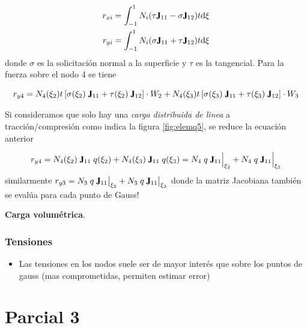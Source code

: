 \documentclass[11pt, a4paper,titlepage]{article}
\newcommand{\rmfontbf}[1]{{\fontfamily{ptm}\selectfont%
\textbf{#1}}}
\newcommand{\di}{\textrm{d}}
\newcommand{\jac}{\rmfontbf{J}}
\newcommand{\feaSP}{null.tex}
\begin{document}
\begin{align}
    r_{xi}&=\int^1_{-1}N_i (\tau \jac_{11}- \sigma \jac_{12})t\di \xi \\
    r_{yi}&=\int^1_{-1}N_i (\sigma \jac_{11}+\tau \jac_{12})t \di \xi 
\end{align}
    donde $\sigma$ es la solicitación normal a la superficie y $\tau$ es la tangencial. Para la fuerza sobre el nodo 4 se tiene
    
    $$r_{y4}= N_4(\xi_2)t\left[\sigma(\xi_2)\; \jac_{11}+\tau(\xi_2)\; \jac_{12}\right] \cdot W_2 + N_4(\xi_3)t\left[\sigma(\xi_3)\; \jac_{11}+\tau(\xi_3)\; \jac_{12}\right]\cdot W_3 $$

    Si consideramos que solo hay una \emph{carga distribuida de linea} a tracción/compresión como indica la figura \ref{fig:elemq5}, se reduce la ecuación anterior
    
    $$ r_{y4} = N_4(\xi_2)\;\jac_{11}\;q(\xi_2) + N_4(\xi_3)\;\jac_{11}\;q(\xi_3) =N_4\;q \;\jac_{11}\Big|_{\xi_2} + N_4\;q\; \jac_{11}\Big|_{\xi_3} $$
    similarmente $r_{y3} = N_3\;q \;\jac_{11}\big|_{\xi_2} + N_3\;q\; \jac_{11}\big|_{\xi_3} $ donde la matriz Jacobiana también se evalúa para cada punto de Gauss!
    
    \textbf{Carga volumétrica}. 
\subsubsection*{Tensiones}
    \begin{itemize}
        \item Las tensiones en los nodos suele ser de mayor interés que sobre los puntos de gauss (mas comprometidas, permiten estimar error)
    \end{itemize}
    \clearpage
 
\section{Parcial 3}
\end{document}
